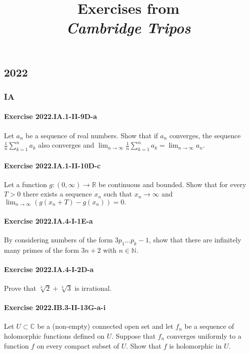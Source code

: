 \documentclass{article}
\title{\textbf{
Exercises from \\
\textit{Cambridge Tripos}
}}
\date{}
\begin{document}
\maketitle

\subsection*{2022}
\subsubsection*{IA}
\paragraph{Exercise 2022.IA.1-II-9D-a} Let $a_{n}$ be a sequence of real numbers. Show that if $a_{n}$ converges, the sequence $\frac{1}{n} \sum_{k=1}^{n} a_{k}$ also converges and $\lim _{n \rightarrow \infty} \frac{1}{n} \sum_{k=1}^{n} a_{k}=\lim _{n \rightarrow \infty} a_{n}$.

\paragraph{Exercise 2022.IA.1-II-10D-c} Let a function $g:(0, \infty) \rightarrow \mathbb{R}$ be continuous and bounded. Show that for every $T>0$ there exists a sequence $x_{n}$ such that $x_{n} \rightarrow \infty$ and $\lim _{n \rightarrow \infty}\left(g\left(x_{n}+T\right)-g\left(x_{n}\right)\right)=0 .$

\paragraph{Exercise 2022.IA.4-I-1E-a} By considering numbers of the form $3 p_{1} \ldots p_{k}-1$, show that there are infinitely many primes of the form $3 n+2$ with $n \in \mathbb{N}$.

\paragraph{Exercise 2022.IA.4-I-2D-a} Prove that $\sqrt[3]{2}+\sqrt[3]{3}$ is irrational.

\paragraph{Exercise 2022.IB.3-II-13G-a-i} Let $U \subset \mathbb{C}$ be a (non-empty) connected open set and let $f_n$ be a sequence of holomorphic functions defined on $U$. Suppose that $f_n$ converges uniformly to a function $f$ on every compact subset of $U$. Show that $f$ is holomorphic in $U$.
\end{document}
